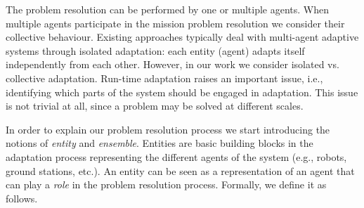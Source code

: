 \documentclass[journal]{IEEEtran}
\theoremstyle{definition}
\begin{document}
The problem resolution can be performed by one or multiple agents. When multiple agents participate in the mission problem resolution we  consider their collective behaviour.
Existing approaches typically deal with
multi-agent adaptive systems through isolated adaptation: each entity (agent) adapts itself independently from each
other. However, in our work we consider isolated vs. collective adaptation.
Run-time adaptation raises an important issue, i.e., identifying
which parts of the system should be engaged in adaptation.
This issue is not trivial at all, since a problem may be solved at different scales.

In order to explain our problem resolution process we
start introducing the notions of \textit{entity} and \textit{ensemble}.
Entities are basic building blocks in the adaptation process representing the different agents of the system (e.g., robots, ground stations, etc.).
An entity can be seen as a representation of an agent that can play a \textit{role} in the problem resolution process. 
Formally, we define it as follows.
\end{document}
